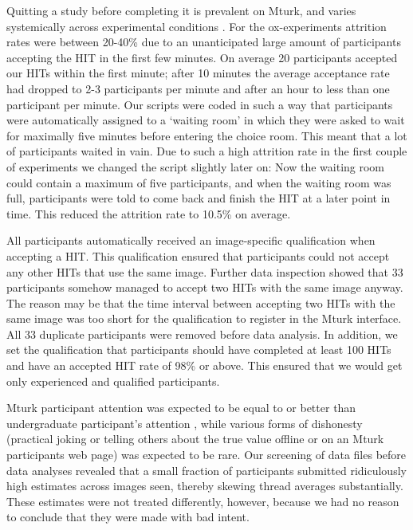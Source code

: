 \documentclass[9pt,twoside,lineno]{pnas-new}
\begin{document}
Quitting a study before completing it is prevalent on Mturk, and varies systemically across experimental conditions \cite{zhou2016pitfall}. For the ox-experiments attrition rates were between 20-40\% due to an unanticipated large amount of participants accepting the HIT in the first few minutes. On average 20 participants accepted our HITs within the first minute; after 10 minutes the average acceptance rate had dropped to 2-3 participants per minute and after an hour to less than one participant per minute. Our scripts were coded in such a way that participants were automatically assigned to a ‘waiting room’ in which they were asked to wait for maximally five minutes before entering the choice room. This meant that a lot of participants waited in vain. Due to such a high attrition rate in the first couple of experiments we changed the script slightly later on: Now the waiting room could contain a maximum of five participants, and when the waiting room was full, participants were told to come back and finish the HIT at a later point in time. This reduced the attrition rate to 10.5\% on average.

All participants automatically received an image-specific qualification when accepting a HIT. This qualification ensured that participants could not accept any other HITs that use the same image. Further data inspection showed that 33 participants somehow managed to accept two HITs with the same image anyway. The reason may be that the time interval between accepting two HITs with the same image was too short for the qualification to register in the Mturk interface. All 33 duplicate participants were removed before data analysis. In addition, we set the qualification that participants should have completed at least 100 HITs and have an accepted HIT rate of 98\% or above. This ensured that we would get only experienced and qualified participants.

Mturk participant attention was expected to be equal to or better than undergraduate participant’s attention \cite{hauser2016attentive}, while various forms of dishonesty (practical joking or telling others about the true value offline or on an Mturk participants web page) was expected to be rare. Our screening of data files before data analyses revealed that a small fraction of participants submitted ridiculously high estimates across images seen, thereby skewing thread averages substantially. These estimates were not treated differently, however, because we had no reason to conclude that they were made with bad intent.
\end{document}
